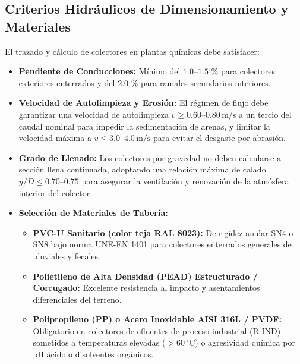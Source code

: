 \documentclass{report}
\begin{document}
\subsection{Criterios Hidráulicos de Dimensionamiento y Materiales}
El trazado y cálculo de colectores en plantas químicas debe satisfacer:
\begin{itemize}
    \item \textbf{Pendiente de Conducciones:} Mínimo del $1.0\text{--}1.5\text{ \%}$ para colectores exteriores enterrados y del $2.0\text{ \%}$ para ramales secundarios interiores.
    \item \textbf{Velocidad de Autolimpieza y Erosión:} El régimen de flujo debe garantizar una velocidad de autolimpieza $v \ge 0.60\text{--}0.80\,\text{m/s}$ a un tercio del caudal nominal para impedir la sedimentación de arenas, y limitar la velocidad máxima a $v \le 3.0\text{--}4.0\,\text{m/s}$ para evitar el desgaste por abrasión.
    \item \textbf{Grado de Llenado:} Los colectores por gravedad no deben calcularse a sección llena continuada, adoptando una relación máxima de calado $y/D \le 0.70\text{--}0.75$ para asegurar la ventilación y renovación de la atmósfera interior del colector.
    \item \textbf{Selección de Materiales de Tubería:}
    \begin{itemize}
        \item \textbf{PVC-U Sanitario (color teja RAL 8023):} De rigidez anular SN4 o SN8 bajo norma UNE-EN 1401 para colectores enterrados generales de pluviales y fecales.
        \item \textbf{Polietileno de Alta Densidad (PEAD) Estructurado / Corrugado:} Excelente resistencia al impacto y asentamientos diferenciales del terreno.
        \item \textbf{Polipropileno (PP) o Acero Inoxidable AISI 316L / PVDF:} Obligatorio en colectores de efluentes de proceso industrial (R-IND) sometidos a temperaturas elevadas ($> 60\,^\circ\text{C}$) o agresividad química por pH ácido o disolventes orgánicos.
    \end{itemize}
\end{itemize}
\end{document}
